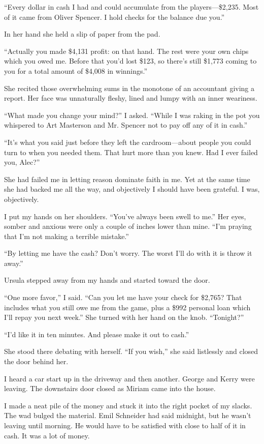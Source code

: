 \documentclass{novel}
\begin{document}
“Every dollar in cash I had and could accumulate from the players—\$2,235. Most of it came from Oliver Spencer. I hold checks for the balance due you.” 

In her hand she held a slip of paper from the pad. 

“Actually you made \$4,131 profit: on that hand. The rest were your own chips which you owed me. Before that you’d lost \$123, so there’s still \$1,773 coming to you for a total amount of \$4,008 in winnings.” 

She recited those overwhelming sums in the monotone of an accountant giving a report. Her face was unnaturally fleshy, lined and lumpy with an inner weariness.

“What made you change your mind?” I asked. “While I was raking in the pot you whispered to Art Masterson and Mr. Spencer not to pay off any of it in cash.”

“It’s what you said just before they left the cardroom—about people you could turn to when you needed them. That hurt more than you knew. Had I ever failed you, Alec?”

She had failed me in letting reason dominate faith in me. Yet at the same time she had backed me all the way, and objectively I should have been grateful. I was, objectively.

I put my hands on her shoulders. “You’ve always been swell to me.” Her eyes, somber and anxious were only a couple of inches lower than mine. “I’m praying that I’m not making a terrible mistake.”

“By letting me have the cash? Don’t worry. The worst I’ll do with it is throw it away.”

Ursula stepped away from my hands and started toward the door.

“One more favor,” I said. “Can you let me have your check for \$2,765? That includes what you still owe me from the game, plus a \$992 personal loan which I’ll repay you next week.” She turned with her hand on the knob. “Tonight?”

“I’d like it in ten minutes. And please make it out to cash.”

She stood there debating with herself. “If you wish,” she said listlessly and closed the door behind her.

I heard a car start up in the driveway and then another. George and Kerry were leaving. The downstairs door closed as Miriam came into the house.

\scenestars

I made a neat pile of the money and stuck it into the right pocket of my slacks. The wad bulged the material. Emil Schneider had said midnight, but he wasn’t leaving until morning. He would have to be satisfied with close to half of it in cash. It was a lot of money.
\end{document}
